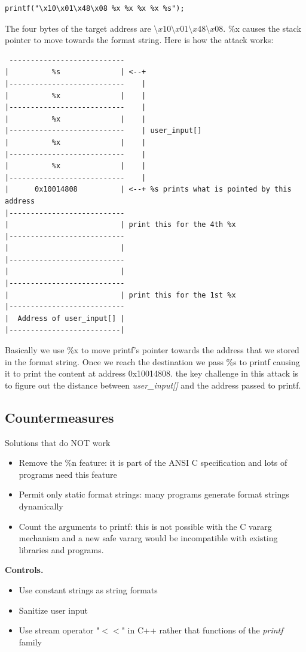 \documentclass[10pt,a4paper]{article}
\begin{document}
\begin{verbatim}
printf("\x10\x01\x48\x08 %x %x %x %x %s");
\end{verbatim}
The four bytes of the target address are  $\setminus x10 \setminus x01 \setminus x48 \setminus x08$. \%x causes the stack pointer to move towards the format string. Here is how the attack works:
\begin{Verbatim}
 ---------------------------
|          %s              | <--+
|---------------------------    |
|          %x              |    |
|---------------------------    |
|          %x              |    |  
|---------------------------    | user_input[]
|          %x              |    |  
|---------------------------    |
|          %x              |    |
|---------------------------    |
|      0x10014808          | <--+ %s prints what is pointed by this address
|---------------------------
|                          | print this for the 4th %x
|---------------------------
|                          |
|---------------------------
|                          |
|---------------------------
|                          | print this for the 1st %x
|---------------------------
|  Address of user_input[] |
|--------------------------|
\end{Verbatim}
Basically we use \%x to move printf's pointer towards the address that we stored in the format string. Once we reach the destination we pass \%s to printf causing it to print the content at address 0x10014808. the key challenge in this attack is to figure out the distance between \emph{user\_input[]} and the address passed to printf.
\subsection{Countermeasures}
Solutions that do NOT work
\begin{itemize}
\item Remove the \%n feature: it is part of the ANSI C specification and lots of programs need this feature
\item Permit only static format strings: many programs generate format strings dynamically
\item Count the arguments to printf: this is not possible with the C vararg mechanism and a new safe vararg would be incompatible with existing libraries and programs.
\end{itemize}
\newpage
\textbf{Controls.} 
\begin{itemize}
\item Use constant strings as string formats
\item Sanitize user input
\item Use stream operator "$<<$" in C++ rather that functions of the \emph{printf} family
\end{itemize}
\end{document}

